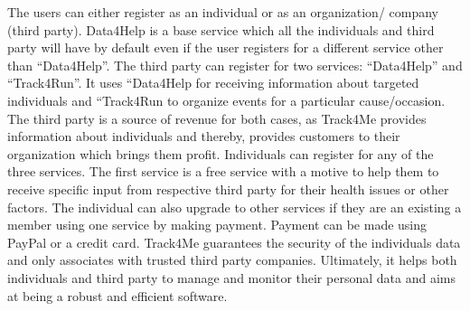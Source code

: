 The users can either register as an individual or as an organization/ company (third party). Data4Help is a base service which all the individuals and third party will have by default even if the user registers for a different service other than “Data4Help”. The third party can register for two services: “Data4Help” and “Track4Run”. It uses “Data4Help for receiving information about targeted individuals and “Track4Run to organize events for a particular cause/occasion. The third party is a source of revenue for both cases, as Track4Me provides information about individuals and thereby,  provides customers to their organization which brings them profit. Individuals can register for any of the three services. The first service is a free service  with a motive to help them to receive specific input from respective third party for their health issues or other factors. The individual can also upgrade to other services if they are an existing a member using one service by making payment. Payment can be made using PayPal or a credit card. Track4Me guarantees the security of the individuals data and only associates with trusted third party companies. Ultimately, it helps both individuals and third party to manage and monitor their personal data and aims at being a robust and efficient software.
